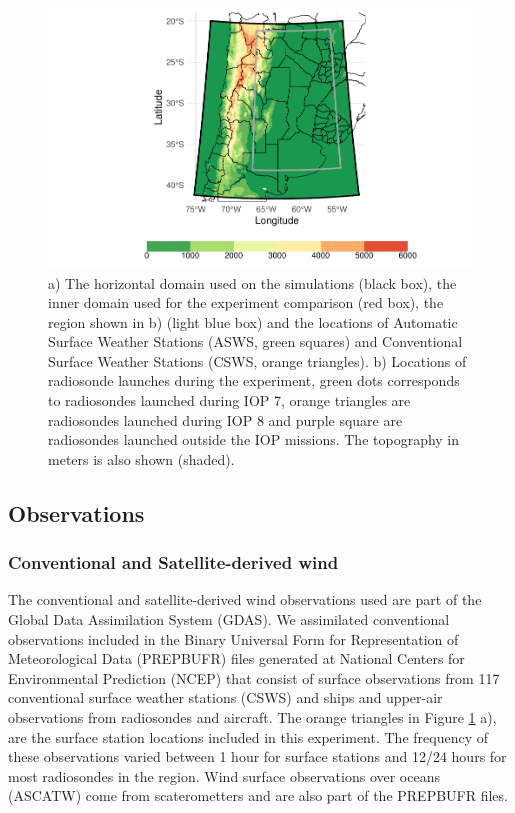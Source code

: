 \documentclass[final,5p,times,twocolumn,authoryear]{elsarticle} %
\begin{document}
\begin{figure}
\includegraphics[width=1\linewidth]{../figures/dominio-1} \caption{a) The horizontal domain used on the simulations (black box), the inner domain used for the experiment comparison (red box), the region shown in b) (light blue box) and the locations of Automatic Surface Weather Stations (ASWS, green squares) and Conventional Surface Weather Stations (CSWS, orange triangles). b) Locations of radiosonde launches during the experiment, green dots corresponds to radiosondes launched during IOP 7, orange triangles are radiosondes launched during IOP 8 and purple square are radiosondes launched outside the IOP missions. The topography in meters is also shown (shaded).}\label{fig:dominio}
\end{figure}

\hypertarget{observations}{%
\subsection{Observations}\label{observations}}

\hypertarget{conventional-and-satellite-derived-wind}{%
\subsubsection{Conventional and Satellite-derived wind}\label{conventional-and-satellite-derived-wind}}

The conventional and satellite-derived wind observations used are part of the Global Data Assimilation System (GDAS). We assimilated conventional observations included in the Binary Universal Form for Representation of Meteorological Data (PREPBUFR) files generated at National Centers for Environmental Prediction (NCEP) that consist of surface observations from 117 conventional surface weather stations (CSWS) and ships and upper-air observations from radiosondes and aircraft. The orange triangles in Figure \ref{fig:dominio} a), are the surface station locations included in this experiment. The frequency of these observations varied between 1 hour for surface stations and 12/24 hours for most radiosondes in the region. Wind surface observations over oceans (ASCATW) come from scaterometters and are also part of the PREPBUFR files.
\end{document}
